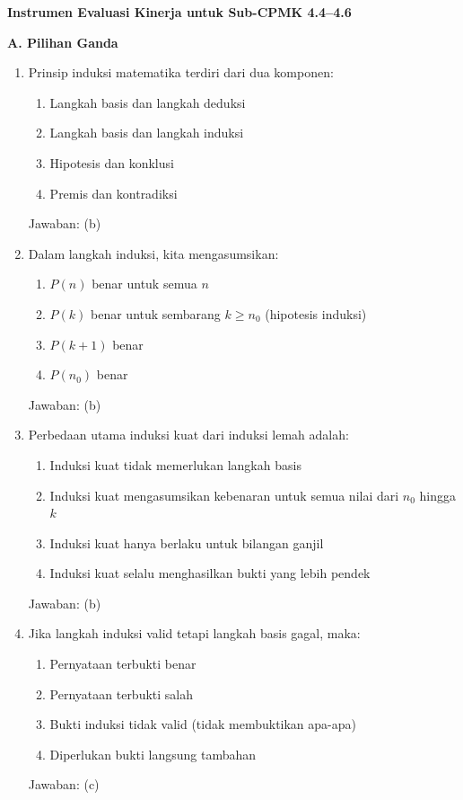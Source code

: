 \documentclass[../main]{subfiles}
\begin{document}
\begin{asesmen}
\textbf{Instrumen Evaluasi Kinerja untuk Sub-CPMK 4.4--4.6}

\textbf{A. Pilihan Ganda}
\begin{enumerate}
  \item Prinsip induksi matematika terdiri dari dua komponen:
  \begin{enumerate}
    \item Langkah basis dan langkah deduksi
    \item Langkah basis dan langkah induksi
    \item Hipotesis dan konklusi
    \item Premis dan kontradiksi
  \end{enumerate}
  Jawaban: (b)

  \item Dalam langkah induksi, kita mengasumsikan:
  \begin{enumerate}
    \item $P(n)$ benar untuk semua $n$
    \item $P(k)$ benar untuk sembarang $k \geq n_0$ (hipotesis induksi)
    \item $P(k+1)$ benar
    \item $P(n_0)$ benar
  \end{enumerate}
  Jawaban: (b)

  \item Perbedaan utama induksi kuat dari induksi lemah adalah:
  \begin{enumerate}
    \item Induksi kuat tidak memerlukan langkah basis
    \item Induksi kuat mengasumsikan kebenaran untuk semua nilai dari $n_0$ hingga $k$
    \item Induksi kuat hanya berlaku untuk bilangan ganjil
    \item Induksi kuat selalu menghasilkan bukti yang lebih pendek
  \end{enumerate}
  Jawaban: (b)

  \item Jika langkah induksi valid tetapi langkah basis gagal, maka:
  \begin{enumerate}
    \item Pernyataan terbukti benar
    \item Pernyataan terbukti salah
    \item Bukti induksi tidak valid (tidak membuktikan apa-apa)
    \item Diperlukan bukti langsung tambahan
  \end{enumerate}
  Jawaban: (c)


\end{enumerate}
\end{asesmen}
\end{document}
